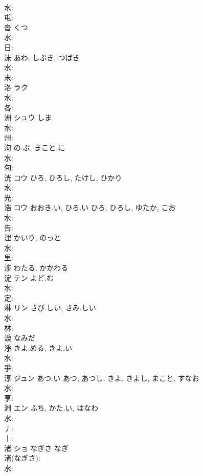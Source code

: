 \documentclass[8pt]{extreport}
\begin{document}
\begin{CJK}{UTF8}{min}
\\	水: 
\\	屯: 
\\	沓		くつ				
\\	水: 
\\	日: 
\\	沫		あわ, しぶき, つばき			
\\	水: 
\\	末: 
\\	洛	ラク			
\\	水: 
\\	各: 
\\	洲	シュウ	しま		
\\	水: 
\\	州: 
\\	洵		の.ぶ, まこと.に			
\\	水: 
\\	旬: 
\\	洸	コウ		ひろ, ひろし, たけし, ひかり	
\\	水: 
\\	光: 
\\	浩	コウ	おおき.い, ひろ.い	ひろ, ひろし, ゆたか, こお	
\\	水: 
\\	告: 
\\	浬		かいり, のっと			
\\	水: 
\\	里: 
\\	涉		わたる, かかわる				
\\	淀	テン	よど.む		
\\	水: 
\\	定: 
\\	淋	リン	さび.しい, さみ.しい		
\\	水: 
\\	林: 
\\	淚		なみだ				
\\	淨		きよ.める, きよ.い				
\\	水: 
\\	爭: 
\\	淳	ジュン	あつ.い	あつ, あつし, きよ, きよし, まこと, すなお	
\\	水: 
\\	享: 
\\	淵	エン	ふち, かた.い, はなわ		
\\	水: 
\\	丿: 
\\	丨: 
\\	渚	ショ	なぎさ	なぎ	
\\	渚(なぎさ): 
\\	水: 

\end{CJK}
\end{document}
